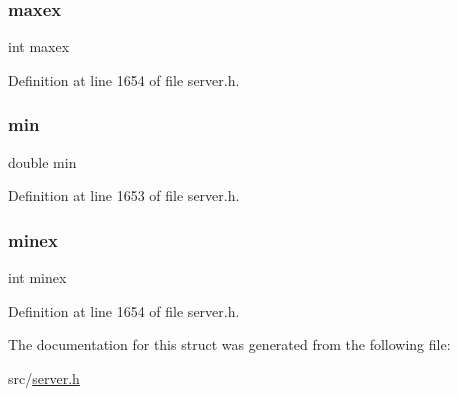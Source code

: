 \subsubsection{\texorpdfstring{maxex}{maxex}}
{\footnotesize\ttfamily int maxex}



Definition at line 1654 of file server.\+h.

\mbox{\label{structzrangespec_aad36546e8175d2922bee165fe028fedc}} 
\subsubsection{\texorpdfstring{min}{min}}
{\footnotesize\ttfamily double min}



Definition at line 1653 of file server.\+h.

\mbox{\label{structzrangespec_a8e30ae1b8a7b7c514cb8bf62df65f4eb}} 
\subsubsection{\texorpdfstring{minex}{minex}}
{\footnotesize\ttfamily int minex}



Definition at line 1654 of file server.\+h.



The documentation for this struct was generated from the following file\+:\begin{DoxyCompactItemize}
\item 
src/\hyperlink{server_8h}{server.\+h}\end{DoxyCompactItemize}
